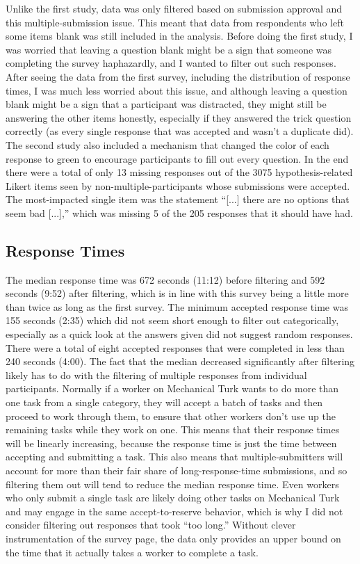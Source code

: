 Unlike the first study, data was only filtered based on submission approval and this multiple-submission issue.
%
This meant that data from respondents who left some items blank was still included in the analysis.
%
Before doing the first study, I was worried that leaving a question blank might be a sign that someone was completing the survey haphazardly, and I wanted to filter out such responses.
%
After seeing the data from the first survey, including the distribution of response times, I was much less worried about this issue, and although leaving a question blank might be a sign that a participant was distracted, they might still be answering the other items honestly, especially if they answered the trick question correctly (as every single response that was accepted and wasn't a duplicate did).
%
The second study also included a mechanism that changed the color of each response to green to encourage participants to fill out every question.
%
In the end there were a total of only 13 missing responses out of the 3075 hypothesis-related Likert items seen by non-multiple-participants whose submissions were accepted.
%
The most-impacted single item was the statement ``[...] there are no options that seem bad [...],'' which was missing 5 of the 205 responses that it should have had.


\subsection{Response Times}

The median response time was 672 seconds (11:12) before filtering and 592 seconds (9:52) after filtering, which is in line with this survey being a little more than twice as long as the first survey.
%
The minimum accepted response time was 155 seconds (2:35) which did not seem short enough to filter out categorically, especially as a quick look at the answers given did not suggest random responses.
%
There were a total of eight accepted responses that were completed in less than 240 seconds (4:00).
%
The fact that the median decreased significantly after filtering likely has to do with the filtering of multiple responses from individual participants.
%
Normally if a worker on Mechanical Turk wants to do more than one task from a single category, they will accept a batch of tasks and then proceed to work through them, to ensure that other workers don't use up the remaining tasks while they work on one.
%
This means that their response times will be linearly increasing, because the response time is just the time between accepting and submitting a task.
%
This also means that multiple-submitters will account for more than their fair share of long-response-time submissions, and so filtering them out will tend to reduce the median response time.
%
Even workers who only submit a single task are likely doing other tasks on Mechanical Turk and may engage in the same accept-to-reserve behavior, which is why I did not consider filtering out responses that took ``too long.''
%
Without clever instrumentation of the survey page, the data only provides an upper bound on the time that it actually takes a worker to complete a task.

